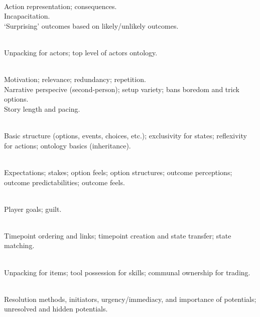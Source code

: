 \begin{table}[!p]
\begin{minipage}[t][0.935\textheight]{\dimexpr0.5\textwidth-1.2em}
\begin{hangparas}{0.8em}{1}
\setlength{\parskip}{0.5em}
 \\
  \cg{[representational]} Action representation; consequences. \\
  \cg{[constituent]} Incapacitation. \\
  \cg{[poetic]} `Surprising' outcomes based on likely/unlikely outcomes.

 \\
  \cg{[representatonal]} Unpacking for actors; top level of actors ontology.

 \\
  \cg{[constituent]} Motivation; relevance; redundancy; repetition.  \\
  \cg{[aesthetic]} Narrative perspecive (second-person); setup variety; bans boredom and trick options. \\
  \cg{[poetic]} Story length and pacing.

   \\
  \cg{[representational]} Basic structure (options, events, choices, etc.); exclusivity for states; reflexivity for actions; ontology basics (inheritance).

   \\
  \cg{[poetic]} Expectations; stakes; option feels; option structures; outcome perceptions; outcome predictabilities; outcome feels.

   \\
  \cg{[poetic]} Player goals; guilt.

   \\
  \cg{[representational]} Timepoint ordering and links; timepoint creation and state transfer; state matching.

   \\
  \cg{[representational]} Unpacking for items; tool possession for skills; communal ownership for trading.
\end{hangparas}%
\end{minipage}%
\hfill
\noindent
\begin{minipage}[t][0.935\textheight]{\dimexpr0.5\textwidth-1.2em}
\begin{hangparas}{0.8em}{1}
\setlength{\parskip}{0.5em}
   \\
  \cg{[representational]} Resolution methods, initiators, urgency/immediacy, and importance of potentials; unresolved and hidden potentials.


\end{hangparas}
\end{minipage}
\end{table}
